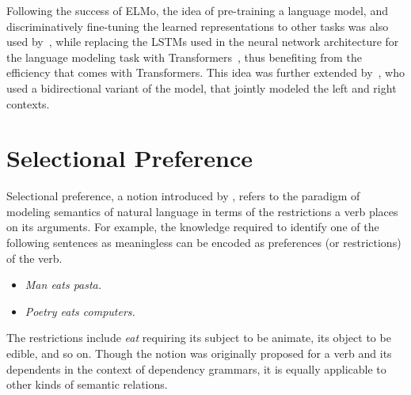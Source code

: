 Following the success of ELMo, the idea of pre-training a language model, and discriminatively fine-tuning the
learned representations to other tasks was also used by~\cite{radford2018improving}, while replacing the LSTMs used
in the neural network architecture for the language modeling task with Transformers~\citep{vaswani2017attention},
thus benefiting from the efficiency that comes with Transformers. This idea was further extended by~\cite{devlin2018bert},
who used a bidirectional variant of the model, that jointly modeled the left and right
contexts.


\section{Selectional Preference}
Selectional preference, a notion introduced by \cite{wilks1973preference}, 
refers to the paradigm of modeling semantics of
natural language in terms of the restrictions a verb places on its arguments. 
For example, the knowledge required to identify
one of the following sentences as meaningless can be encoded as preferences (or 
restrictions) of the verb.
\begin{itemize}
	\item[] \textit{Man eats pasta.}
	\item[] \textit{Poetry eats computers.}
\end{itemize}
The restrictions include \textit{eat} requiring its subject to be animate, its 
object to be edible, and so on. Though the
notion was originally proposed for a verb and its dependents in the context of 
dependency grammars, it is equally applicable to
other kinds of semantic relations.

